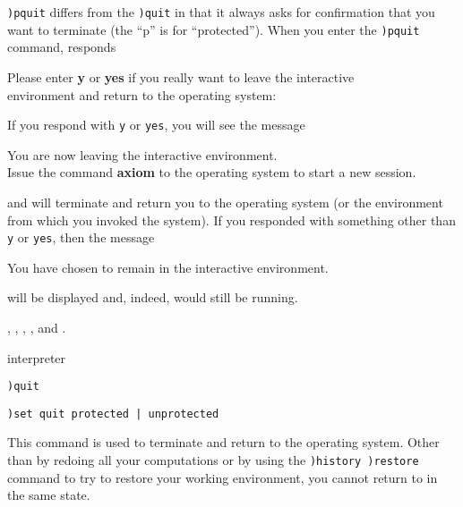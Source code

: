 {{{{{{{{\tt )pquit} differs from the {\tt )quit} in that it always asks for
confirmation that you want to terminate \Language{} (the ``p'' is for
``protected'').
When you enter the {\tt )pquit} command, \Language{} responds
%
\begin{center}
Please enter {\bf y} or {\bf yes} if you really want to leave the interactive \\
environment and return to the operating system:
\end{center}
%
If you respond with {\tt y} or {\tt yes}, you will see the message
%
\begin{center}
You are now leaving the \Language{} interactive environment. \\
Issue the command {\bf axiom} to the operating system to start a new session.
\end{center}
%
and \Language{} will terminate and return you to the operating
system (or the environment from which you invoked the system).
If you responded with something other than {\tt y} or {\tt yes}, then
the message
%
\begin{center}
You have chosen to remain in the \Language{} interactive environment.
\end{center}
%
will be displayed and, indeed, \Language{} would still be running.

\par{}
,
,
,
, and
.




\par{} interpreter

\par{}
\begin{simpleList}
\item{\tt )quit}
\item{\tt )set quit protected | unprotected}
\end{simpleList}

\par{}

This command is used to terminate \Language{}  and return to the
operating system.
Other than by redoing all your computations or by
using the {\tt )history )restore}
command to try to restore your working environment,
you cannot return to \Language{} in the same state.

}}}}}}}
